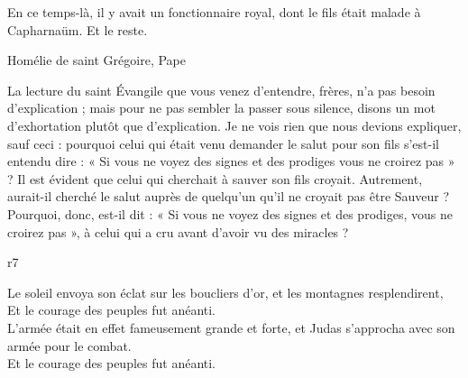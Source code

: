 \documentclass[twoside]{article}
\begin{document}
\begin{paracol}[1]{2}
{		
		
		En ce temps-là, il y avait un fonctionnaire royal, dont le fils était malade à Capharnaüm. Et le reste.
		
		Homélie de saint Grégoire, Pape
		
		
		La lecture du saint Évangile que vous venez d’entendre, frères, n’a pas besoin d’explication ; mais pour ne pas sembler la passer sous silence, disons un mot d’exhortation plutôt que d’explication. Je ne vois rien que nous devions expliquer, sauf ceci : pourquoi celui qui était venu demander le salut pour son fils s’est-il entendu dire : « Si vous ne voyez des signes et des prodiges vous ne croirez pas » ? Il est évident que celui qui cherchait à sauver son fils croyait. Autrement, aurait-il cherché le salut auprès de quelqu’un qu’il ne croyait pas être Sauveur ? Pourquoi, donc, est-il dit : « Si vous ne voyez des signes et des prodiges, vous ne croirez pas », à celui qui a cru avant d’avoir vu des miracles ?
	}
	{r7}
	{\vspace{2cm}
	
	\rr Le soleil envoya son éclat sur les boucliers d'or, et les montagnes resplendirent,\\
	\GreSpecial{*} Et le courage des peuples fut anéanti.\\
	\vv L'armée était en effet fameusement grande et forte, et Judas s'approcha avec son armée pour le combat.\\
	\GreSpecial{*} Et le courage des peuples fut anéanti.}
	

\end{paracol}
\end{document}
